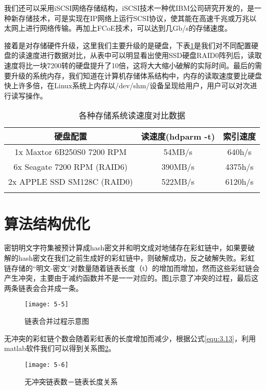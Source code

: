 我们还可以采用iSCSI网络存储结构，iSCSI技术一种优IBM公司研究开发的，是一种新存储技术，可是实现在IP网络上运行SCSI协议，使其能在高速千兆或万兆以太网上进行网络传输。再加上FCoE技术，可以达到几Gb/s的存储速度。

接着是对存储硬件升级，这里我们主要升级的是硬盘，下表\ref{tab:5.1}是我们对不同配置硬盘的读速度进行数据对比，从表中可以明显看出使用SSD硬盘RAID0阵列后，读取速度将比一块7200转的硬盘提升了10倍，这将大大缩小破解的实际时间。最后的需要升级的系统内存，我们知道在计算机存储体系结构中，内存的读取速度要比硬盘快上许多倍，在Linux系统上内存以/dev/shm/设备呈现给用户，用户可以对次进行读写操作。

\begin{longtable}{@{\extracolsep{\fill}}ccc}
\caption{各种存储系统读速度对比数据}\\\toprule[1pt]
\multicolumn{1}{c}{硬盘配置} & 
\multicolumn{1}{c}{读速度(hdparm -t)} &
\multicolumn{1}{c}{索引速度} \\\midrule
1x Maxtor 6B250S0 7200 RPM & 54MB/s & 640h/s \\
6x Seagate 7200 RPM (RAID6) & 390MB/s & 4375h/s \\
2x APPLE SSD SM128C (RAID0) & 522MB/s & 6120h/s \\
\bottomrule[1pt]
\label{tab:5.1}
\end{longtable}

\section{算法结构优化}
密钥明文字符集被预计算成hash密文并和明文成对地储存在彩虹链中，如果要破解的hash密文在我们之前生成好的彩虹链中，则破解成功，反之破解失败。彩虹链存储的“明文-密文”对数量随着链表长度（t）的增加而增加，然而这些彩虹链会产生冲突，主要由于减约函数并不是一一对应的。图\ref{fig:5.5}示意了冲突的过程，最后这两条链表会合并成一条。
\begin{figure}[!ht]
\centering
\texttt{[image: 5-5]}
\caption{链表合并过程示意图}
\label{fig:5.5}
\end{figure}

无冲突的彩虹链个数会随着彩虹表的长度增加而减少，根据公式\eqref{equ:3.13}，利用matlab软件我们可以得到关系图\ref{fig:5.6}。
\begin{figure}[!ht]
\centering
\texttt{[image: 5-6]}
\caption{无冲突链表数－链表长度关系}
\label{fig:5.6}
\end{figure}

